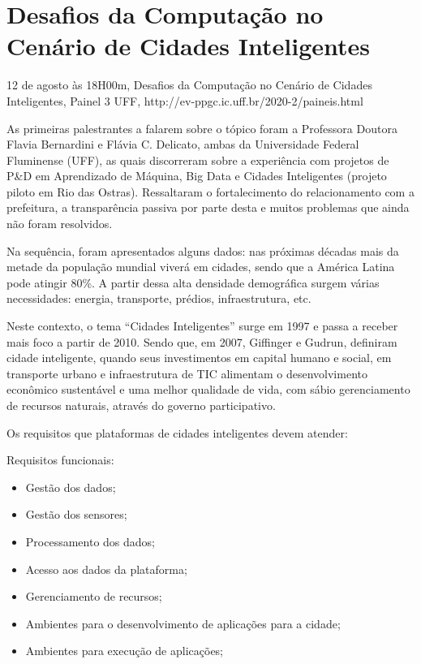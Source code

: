 \section{Desafios da Computação no Cenário de Cidades Inteligentes}

\begin{center}
  \vspace{1cm}
  12 de agosto às 18H00m, Desafios da Computação no Cenário de Cidades Inteligentes, Painel 3 UFF, http://ev-ppgc.ic.uff.br/2020-2/paineis.html
  \vspace{1cm}
\end{center}

As primeiras palestrantes a falarem sobre o tópico foram a Professora Doutora Flavia Bernardini e Flávia C. Delicato, ambas da Universidade Federal Fluminense (UFF), as quais discorreram sobre a experiência com projetos de P\&D em Aprendizado de Máquina, Big Data e Cidades Inteligentes (projeto piloto em Rio das Ostras). Ressaltaram o fortalecimento do relacionamento com a prefeitura, a transparência passiva por parte desta e muitos problemas que ainda não foram resolvidos.

Na sequência, foram apresentados alguns dados: nas próximas décadas mais da metade da população mundial viverá em cidades, sendo que a América Latina pode atingir 80\%. A partir dessa alta densidade demográfica surgem várias necessidades: energia, transporte, prédios, infraestrutura, etc. 

Neste contexto, o tema “Cidades Inteligentes” surge em 1997 e passa a receber mais foco a partir de 2010. Sendo que, em 2007, Giffinger e Gudrun, definiram cidade inteligente, quando seus investimentos em capital humano e social, em transporte urbano e infraestrutura de TIC alimentam o desenvolvimento econômico sustentável e uma melhor qualidade de vida, com sábio gerenciamento de recursos naturais, através do governo participativo.

Os requisitos que plataformas de cidades inteligentes devem atender:

Requisitos funcionais:

\begin{itemize}
  \item Gestão dos dados;
  \item Gestão dos sensores;
  \item Processamento dos dados;
  \item Acesso aos dados da plataforma;
  \item Gerenciamento de recursos;
  \item Ambientes para o desenvolvimento de aplicações para a cidade;
  \item Ambientes para execução de aplicações;
\end{itemize}

